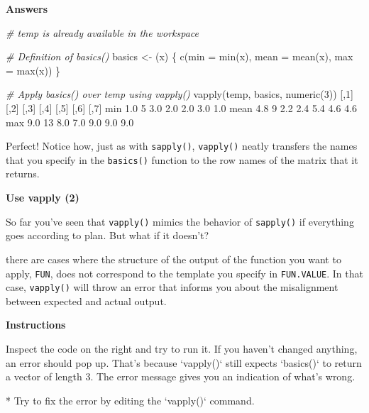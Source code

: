 \documentclass[]{article}
\newcommand{\hlnum}[1]{\textcolor[rgb]{0.816,0.125,0.439}{#1}}%
\newcommand{\hlstr}[1]{\textcolor[rgb]{0.251,0.627,0.251}{#1}}%
\newcommand{\hlcom}[1]{\textcolor[rgb]{0.502,0.502,0.502}{\textit{#1}}}%
\newcommand{\hlstd}[1]{\textcolor[rgb]{0.251,0.251,0.251}{#1}}%
\newcommand{\hlkwc}[1]{\textcolor[rgb]{0.251,0.251,0.251}{#1}}%
\newcommand{\hlkwd}[1]{\textcolor[rgb]{0.878,0.439,0.125}{#1}}%
\newenvironment{Shaded}{\begin{myshaded}}{\end{myshaded}}
\newcommand{\KeywordTok}[1]{\hlkwd{#1}}
\newcommand{\DataTypeTok}[1]{\hlkwc{#1}}
\newcommand{\DecValTok}[1]{\hlnum{#1}}
\newcommand{\FloatTok}[1]{\hlnum{#1}}
\newcommand{\StringTok}[1]{\hlstr{#1}}
\newcommand{\CommentTok}[1]{\hlcom{#1}}
\newcommand{\NormalTok}[1]{\hlstd{#1}}
\begin{document}
\textbf{Answers}

\begin{Shaded}
\begin{Highlighting}[]
\CommentTok{# temp is already available in the workspace}

\CommentTok{# Definition of basics()}
\NormalTok{basics <-}\StringTok{ }\NormalTok{(x) \{}
  \KeywordTok{c}\NormalTok{(}\DataTypeTok{min =} \KeywordTok{min}\NormalTok{(x), }\DataTypeTok{mean =} \KeywordTok{mean}\NormalTok{(x), }\DataTypeTok{max =} \KeywordTok{max}\NormalTok{(x))}
\NormalTok{\}}

\CommentTok{# Apply basics() over temp using vapply()}
\KeywordTok{vapply}\NormalTok{(temp, basics, }\KeywordTok{numeric}\NormalTok{(}\DecValTok{3}\NormalTok{))}
\NormalTok{        [,}\DecValTok{1}\NormalTok{] [,}\DecValTok{2}\NormalTok{] [,}\DecValTok{3}\NormalTok{] [,}\DecValTok{4}\NormalTok{] [,}\DecValTok{5}\NormalTok{] [,}\DecValTok{6}\NormalTok{] [,}\DecValTok{7}\NormalTok{]}
\NormalTok{   min  }\OperatorTok{-}\FloatTok{1.0}    \DecValTok{5} \OperatorTok{-}\FloatTok{3.0} \OperatorTok{-}\FloatTok{2.0}  \FloatTok{2.0} \OperatorTok{-}\FloatTok{3.0}  \FloatTok{1.0}
\NormalTok{   mean  }\FloatTok{4.8}    \DecValTok{9}  \FloatTok{2.2}  \FloatTok{2.4}  \FloatTok{5.4}  \FloatTok{4.6}  \FloatTok{4.6}
\NormalTok{   max   }\FloatTok{9.0}   \DecValTok{13}  \FloatTok{8.0}  \FloatTok{7.0}  \FloatTok{9.0}  \FloatTok{9.0}  \FloatTok{9.0}
\end{Highlighting}
\end{Shaded}

Perfect! Notice how, just as with \texttt{sapply()}, \texttt{vapply()}
neatly transfers the names that you specify in the \texttt{basics()}
function to the row names of the matrix that it returns.

\textbf{Use vapply (2)}

So far you've seen that \texttt{vapply()} mimics the behavior of
\texttt{sapply()} if everything goes according to plan. But what if it
doesn't?

there are cases where the structure of the output of the function you
want to apply, \texttt{FUN}, does not correspond to the template you
specify in \texttt{FUN.VALUE}. In that case, \texttt{vapply()} will
throw an error that informs you about the misalignment between expected
and actual output.

\textbf{Instructions}

\begin{Shaded}
\begin{Highlighting}[]
\OperatorTok{*}\StringTok{ }\NormalTok{Inspect the code on the right and try to run it. If you haven}\StringTok{'t changed anything, an error should pop up. That'}\NormalTok{s because }\StringTok{`}\DataTypeTok{vapply()}\StringTok{`}\NormalTok{ still expects }\StringTok{`}\DataTypeTok{basics()}\StringTok{`}\NormalTok{ to return a vector of length }\DecValTok{3}\NormalTok{. The error message gives you an indication of what}\StringTok{'s wrong.}

\StringTok{* Try to fix the error by editing the `vapply()` command.}
\end{Highlighting}
\end{Shaded}
\end{document}
